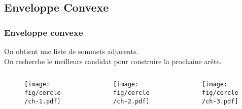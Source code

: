 \subsection{Enveloppe Convexe}

\begin{frame}
  \frametitle{Enveloppe convexe}

  \begin{block}{}
    On obtient une liste de sommets adjacents.\\
    On recherche le meilleurs candidat pour construire la prochaine arête.
  \end{block} 

  \begin{columns}[t]
 	 \begin{column}{3cm}
			\begin{figure}[h!]
	      \centering
	      \texttt{[image: fig/cercle/ch-1.pdf]}
     	\end{figure}    
    \end{column}

    \begin{column}{3cm}
      \begin{figure}[h!]
		      \centering
		      \texttt{[image: fig/cercle/ch-2.pdf]}
     	\end{figure}    
    \end{column}
			
		\begin{column}{3cm}
      \begin{figure}[h!]
		      \centering
		      \texttt{[image: fig/cercle/ch-3.pdf]}
     	\end{figure}    
    \end{column}
        
	\end{columns}  

\end{frame}


